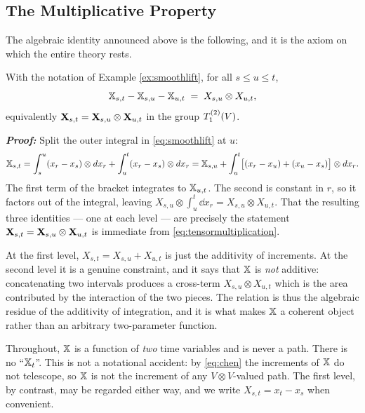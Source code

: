 
\subsection{The Multiplicative Property}\label{subsec:multiplicative}

The algebraic identity announced above is the following, and it is the axiom on which the entire
theory rests.

\begin{proposition}\label{prop:chensmooth}
With the notation of Example \ref{ex:smoothlift}, for all $s \leq u \leq t$,
\begin{equation}\label{eq:chen}
\mathbb{X}_{s,t} - \mathbb{X}_{s,u} - \mathbb{X}_{u,t} \;=\; X_{s,u}\otimes X_{u,t},
\end{equation}
equivalently $\mathbf{X}_{s,t} = \mathbf{X}_{s,u}\otimes\mathbf{X}_{u,t}$ in the group $T_{1}^{(2)}(V)$.
\end{proposition}

\textbf{\textit{Proof:}} Split the outer integral in \eqref{eq:smoothlift} at $u$:
\[
\mathbb{X}_{s,t} = \int_s^u (x_r - x_s)\otimes d x_r + \int_u^t (x_r-x_s)\otimes d x_r
= \mathbb{X}_{s,u} + \int_u^t \bigl[(x_r - x_u) + (x_u - x_s)\bigr]\otimes d x_r .
\]
The first term of the bracket integrates to $\mathbb{X}_{u,t}$. The second is constant in $r$, so it
factors out of the integral, leaving $X_{s,u}\otimes\int_u^t \dd x_r = X_{s,u}\otimes X_{u,t}$. That
the resulting three identities --- one at each level --- are precisely the statement
$\mathbf{X}_{s,t} = \mathbf{X}_{s,u}\otimes\mathbf{X}_{u,t}$ is immediate from \eqref{eq:tensormultiplication}.
\qedfilledtext

\medskip
At the first level, 
$X_{s,t} = X_{s,u} + X_{u,t}$ is just the additivity of increments. At the second level it is a genuine
constraint, and it says that $\mathbb{X}$ is \emph{not} additive: concatenating two intervals produces a
cross-term $X_{s,u}\otimes X_{u,t}$ which is the area contributed by the interaction of the two
pieces. The relation is thus the algebraic residue of the additivity of integration, and it is what
makes $\mathbb{X}$ a coherent object rather than an arbitrary two-parameter function.

\begin{notationbox}
Throughout, $\mathbb{X}$ is a function of \emph{two} time variables and is never a path. There is no
``$\mathbb{X}_t$''. This is not a notational accident: by \eqref{eq:chen} the increments of $\mathbb{X}$ do not
telescope, so $\mathbb{X}$ is not the increment of any $V\otimes V$-valued path. The first level, by contrast, may be
regarded either way, and we write $X_{s,t} = x_t - x_s$ when convenient.
\end{notationbox}

